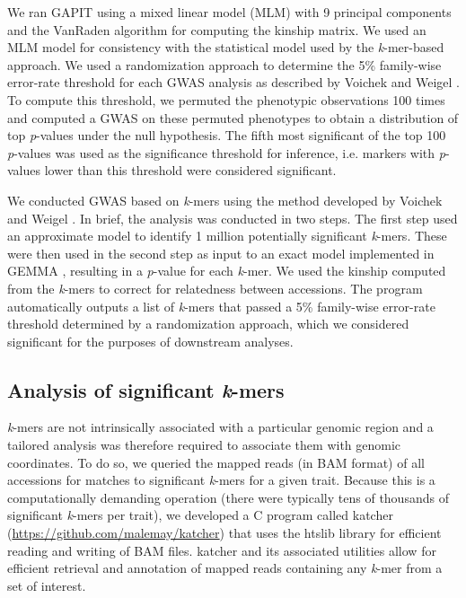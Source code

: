 \documentclass[doublespacing]{bmcart}
\begin{document}
We ran GAPIT using a mixed linear model (MLM) with 9 principal components and the VanRaden
algorithm for computing the kinship matrix. We used an MLM model for
consistency with the statistical model used by the \textit{k}-mer-based
approach.  We used a randomization approach to determine the 5\% family-wise
error-rate threshold for each GWAS analysis as described by Voichek and Weigel \cite{voichek2020}.
To compute this threshold, we permuted the phenotypic observations 100 times
and computed a GWAS on these permuted phenotypes to obtain a distribution of
top \emph{p}-values under the null hypothesis. The fifth most significant of
the top 100 \emph{p}-values was used as the significance threshold for
inference, i.e. markers with \emph{p}-values lower than this threshold were
considered significant.

We conducted GWAS based on \emph{k}-mers using the method developed by
Voichek and Weigel \cite{voichek2020}. In brief, the
analysis was conducted in two steps. The first step used an approximate model
to identify 1 million potentially significant \emph{k}-mers. These were then used in
the second step as input to an exact model implemented in GEMMA \citep{zhou2012}, resulting
in a \emph{p}-value for each \emph{k}-mer. We
used the kinship computed from the \emph{k}-mers to correct for relatedness
between accessions. The program automatically outputs a list of \emph{k}-mers
that passed a 5\% family-wise error-rate threshold determined by a
randomization approach, which we considered significant for the purposes of
downstream analyses.

\subsection*{Analysis of significant \emph{k}-mers}

\emph{k}-mers are not intrinsically associated with a particular genomic region
and a tailored analysis was therefore required to associate them with genomic
coordinates. To do so, we queried the mapped reads (in BAM format) of all accessions for matches
to significant \emph{k}-mers for a given trait. Because this is a
computationally demanding operation (there were typically tens of thousands of
significant \emph{k}-mers per trait), we developed a C program called katcher
(\url{https://github.com/malemay/katcher}) that
uses the htslib library \citep{bonfield2021} for efficient reading and
writing of BAM files. katcher and its associated utilities allow for efficient
retrieval and annotation of mapped reads containing any \emph{k}-mer from a set
of interest.
\end{document}
